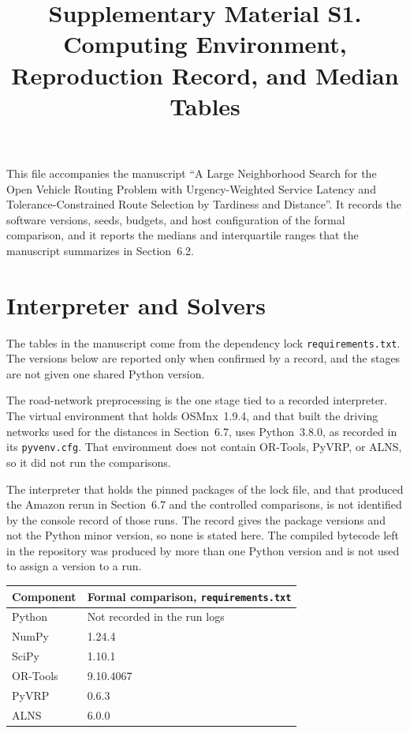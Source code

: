 \documentclass[11pt,a4paper]{article}
\begin{document}
\title{Supplementary Material S1.\\ Computing Environment, Reproduction Record, and Median Tables}
\author{}
\date{}
\maketitle
\vspace{-3em}

This file accompanies the manuscript ``A Large Neighborhood Search for the Open Vehicle Routing Problem with Urgency-Weighted Service Latency and Tolerance-Constrained Route Selection by Tardiness and Distance''. It records the software versions, seeds, budgets, and host configuration of the formal comparison, and it reports the medians and interquartile ranges that the manuscript summarizes in Section~6.2.

\section{Interpreter and Solvers}

The tables in the manuscript come from the dependency lock \texttt{requirements.txt}. The versions below are reported only when confirmed by a record, and the stages are not given one shared Python version.

The road-network preprocessing is the one stage tied to a recorded interpreter. The virtual environment that holds OSMnx~1.9.4, and that built the driving networks used for the distances in Section~6.7, uses Python~3.8.0, as recorded in its \texttt{pyvenv.cfg}. That environment does not contain OR-Tools, PyVRP, or ALNS, so it did not run the comparisons.

The interpreter that holds the pinned packages of the lock file, and that produced the Amazon rerun in Section~6.7 and the controlled comparisons, is not identified by the console record of those runs. The record gives the package versions and not the Python minor version, so none is stated here. The compiled bytecode left in the repository was produced by more than one Python version and is not used to assign a version to a run.

\begin{center}
\begin{tabular}{ll}
\toprule
Component & Formal comparison, \texttt{requirements.txt} \\
\midrule
Python & Not recorded in the run logs \\
NumPy & 1.24.4 \\
SciPy & 1.10.1 \\
OR-Tools & 9.10.4067 \\
PyVRP & 0.6.3 \\
ALNS & 6.0.0 \\
\bottomrule
\end{tabular}
\end{center}
\end{document}
